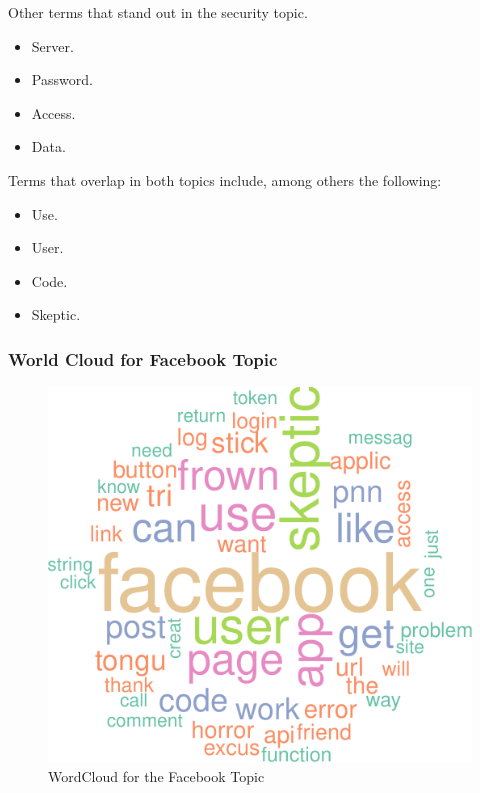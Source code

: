 \documentclass[
]{article}
\providecommand{\tightlist}{%
  \setlength{\itemsep}{0pt}\setlength{\parskip}{0pt}}
\begin{document}
Other terms that stand out in the security topic.

\begin{itemize}
\tightlist
\item
  Server.
\item
  Password.
\item
  Access.
\item
  Data.
\end{itemize}

Terms that overlap in both topics include, among others the following:

\begin{itemize}
\tightlist
\item
  Use.
\item
  User.
\item
  Code.
\item
  Skeptic.
\end{itemize}

\hypertarget{world-cloud-for-facebook-topic}{%
\subsubsection{World Cloud for Facebook
Topic}\label{world-cloud-for-facebook-topic}}

\begin{figure}
\centering
\includegraphics{assign6_files/figure-latex/unnamed-chunk-17-1.pdf}
\caption{WordCloud for the Facebook Topic}
\end{figure}
\end{document}
